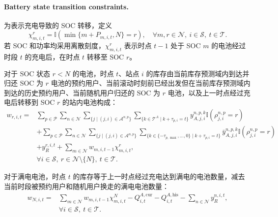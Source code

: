 \documentclass[12pt,hyperref,a4paper,UTF8]{ctexart}
\begin{document}
\paragraph{Battery state transition constraints.}
为表示充电导致的 SOC 转移，定义
\begin{equation}
\chi_{m,i,t}^{r}=\mathbb{I}\!\left(\min\{m+P_{m,i,t},N\}=r\right),
\quad \forall m,r\in\mathcal{N},\ i\in\mathcal{S},\ t\in\mathcal{T}.
\label{eq:charging_indicator}
\end{equation}
若 SOC 和功率均采用离散刻度，$\chi_{m,i,t}^{r}$ 表示时点 $t-1$ 处于 SOC $m$ 的电池经过时段 $t$ 的充电后，在时点 $t$ 转移至 SOC $r$。

对于 SOC 状态 $r<N$ 的电池，时点 $t$、站点 $i$ 的库存由当前库存预测域内到达并归还 SOC 为 $r$ 电池的预约用户、当前滚动时刻前已经出发但在当前库存预测域内到达的历史预约用户、当前随机用户归还的 SOC 为 $r$ 电池，以及上一时点经过充电后转移到 SOC $r$ 的站内电池构成：
\begin{equation}
\begin{aligned}
w_{r,i,t}
=&
\sum_{p\in \mathcal{P}}
\sum_{n\in \mathcal{N}}
\sum_{\{j\mid (j,i)\in \mathcal{A}^{n,p}\}}
\sum_{\{k\in \mathcal{T}^{A}\mid k+\tau_{p,i}=t\}}
y_{A,j,i}^{n,p,k}
\mathbb{I}\!\left(\rho_{j,i}^{n,p}=r\right)
\\
&+
\sum_{p\in \mathcal{P}}
\sum_{n\in \mathcal{N}}
\sum_{\{j\mid (j,i)\in \mathcal{A}^{n,p}\}}
\sum_{\{k\in\{-\tau_{p,\max},\ldots,0\}\mid k+\tau_{p,i}=t\}}
\bar{y}_{A,j,i}^{n,p,k}
\mathbb{I}\!\left(\rho_{j,i}^{n,p}=r\right)
\\
&+
y_R^{r,i,t}
+
\sum_{m\in \mathcal{N}}
w_{m,i,t-1}\chi_{m,i,t}^{r},
\\
&\forall i\in \mathcal{S},\ r\in \mathcal{N}\setminus\{N\},\ t\in \mathcal{T}.
\end{aligned}
\label{eq:transition_nonfull}
\end{equation}

对于满电电池，时点 $t$ 的库存等于上一时点经过充电达到满电的电池数量，减去当前时段被预约用户和随机用户换走的满电电池数量：
\begin{equation}
\begin{aligned}
w_{N,i,t}
=&
\sum_{m\in \mathcal{N}}
w_{m,i,t-1}\chi_{m,i,t}^{N}
-
Q_{i,t}^{A,\mathrm{cur}}
-
Q_{i,t}^{A,\mathrm{his}}
-
\sum_{n\in \mathcal{N}}y_R^{n,i,t},
\\
&\forall i\in \mathcal{S},\ t\in \mathcal{T}.
\end{aligned}
\label{eq:transition_full}
\end{equation}
\end{document}
